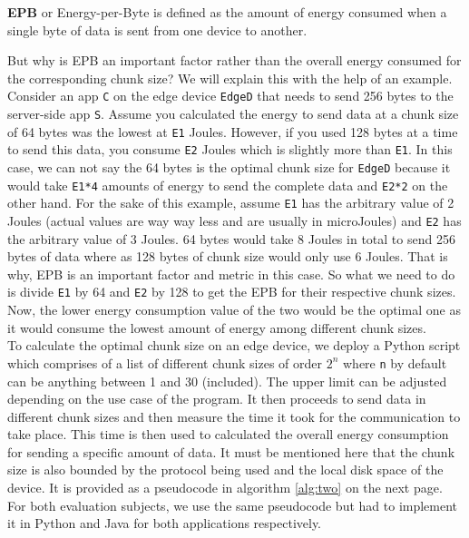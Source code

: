 \begin{definition}
    \textbf{EPB} or Energy-per-Byte is defined as the amount of energy consumed when a single byte of data is sent from one device to another.
\end{definition}

But why is EPB an important factor rather than the overall energy consumed for the corresponding chunk size? 
We will explain this with the help of an example. Consider an app \texttt{C} on the edge device \texttt{EdgeD} that needs 
to send 256 bytes to the server-side app \texttt{S}. Assume you calculated the energy to send data at a 
chunk size of 64 bytes was the lowest at \texttt{E1} Joules. However, if you used 128 bytes at a time to 
send this data, you consume \texttt{E2} Joules which is slightly more than \texttt{E1}. In this case, 
we can not say the 64 bytes is the optimal chunk size for \texttt{EdgeD} because it would take \texttt{E1*4} 
amounts of energy to send the complete data and \texttt{E2*2} on the other hand. For the sake of this 
example, assume \texttt{E1} has the arbitrary value of 2 Joules (actual values are way way less and are usually 
in microJoules) and \texttt{E2} has the arbitrary value of 3 Joules. 64 bytes would take 8 Joules in total 
to send 256 bytes of data where as 128 bytes of chunk size would only use 6 Joules. That is why, EPB is an 
important factor and metric in this case. So what we need to do is divide \texttt{E1} by 64 and \texttt{E2} 
by 128 to get the EPB for their respective chunk sizes. Now, the lower energy consumption value of the 
two would be the optimal one as it would consume the lowest amount of energy among different chunk sizes. \\
To calculate the optimal chunk size on an edge device, we deploy a Python script which comprises of a 
list of different chunk sizes of order \texttt{$2^{n}$} where \texttt{n} by default can be anything between 
1 and 30 (included). The upper limit can be adjusted depending on the use case of the program. It then 
proceeds to send data in different chunk sizes and then measure the time it took for the communication to take 
place. This time is then used to calculated the overall energy consumption for sending a specific amount of 
data. It must be mentioned here that the chunk size is also bounded by the protocol being used and 
the local disk space of the device. 
It is provided as a pseudocode in algorithm \ref{alg:two} on the next page. For both evaluation subjects, 
we use the same pseudocode but had to implement it in Python and Java for both applications respectively. \\

